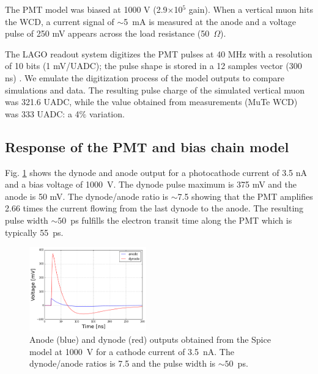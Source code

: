 \documentclass[letterpaper, 10 pt, conference]{ieeeconf}  %
\begin{document}
The PMT model was biased at 1000 V (2.9$\times$10$^5$ gain). When a vertical muon hits the WCD, a current signal of $\sim$5~mA is measured at the anode and a voltage pulse of 250 mV appears across the load resistance (50~$\Omega$). 

The LAGO readout system digitizes the PMT pulses at 40 MHz with a resolution of 10 bits (1 mV/UADC); the pulse shape is stored in a 12 samples vector (300 ns) \cite{SofoHaro2016}. We emulate the digitization process of the model outputs to compare simulations and data. The resulting pulse charge of the simulated vertical muon was 321.6 UADC, while the value obtained from measurements (MuTe WCD) was 333 UADC: a 4$\%$ variation.



\subsection{Response of the PMT and bias chain model}

Fig. \ref{Pulse} shows the dynode and anode output for a photocathode current of 3.5 nA and a bias voltage of 1000~V. The dynode pulse maximum is 375 mV and the anode is 50 mV. The dynode/anode ratio  is $\sim$7.5 showing that the PMT amplifies 2.66 times the current flowing from the last dynode to the anode. The resulting pulse width $\sim50$~ps fulfills the electron transit time along the PMT which is typically 55~ps.

\begin{figure}[h!]
\begin{center}
\includegraphics[width=0.45\textwidth]{Figures/spice_pulse.png}
\caption{Anode (blue) and dynode (red) outputs obtained from the Spice model at 1000~V for a cathode current of 3.5~nA. The dynode/anode ratios is 7.5 and the pulse width is $\sim50$~ps.}
\label{Pulse}
\end{center}
\end{figure}
\end{document}
